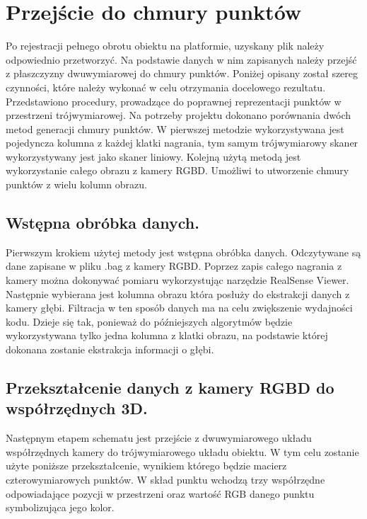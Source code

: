 \section{Przejście do chmury punktów}
Po rejestracji pełnego obrotu obiektu na platformie, uzyskany plik należy odpowiednio przetworzyć. Na podstawie danych w nim zapisanych należy przejść z płaszczyzny dwuwymiarowej do chmury punktów. Poniżej opisany został szereg czynności, które należy wykonać w celu otrzymania docelowego rezultatu. Przedstawiono procedury, prowadzące do poprawnej reprezentacji punktów w przestrzeni trójwymiarowej. Na potrzeby projektu dokonano porównania dwóch metod generacji chmury punktów. W pierwszej metodzie wykorzystywana jest pojedyncza kolumna z każdej klatki nagrania, tym samym trójwymiarowy skaner wykorzystywany jest jako skaner liniowy. Kolejną użytą metodą jest wykorzystanie całego obrazu z kamery RGBD. Umożliwi to utworzenie chmury punktów z wielu kolumn obrazu.
\subsection{Wstępna obróbka danych.}
Pierwszym krokiem użytej metody jest wstępna obróbka danych. Odczytywane są dane zapisane w pliku .bag z kamery RGBD. Poprzez zapis całego nagrania z kamery można dokonywać pomiaru wykorzystując narzędzie RealSense Viewer. Następnie wybierana jest kolumna obrazu która posłuży do ekstrakcji danych z kamery głębi. Filtracja w ten sposób danych ma na celu zwiększenie wydajności kodu. Dzieje się tak, ponieważ do późniejszych algorytmów będzie wykorzystywana tylko jedna kolumna z klatki obrazu, na podstawie której dokonana zostanie ekstrakcja informacji o głębi.

\subsection{Przekształcenie danych z kamery RGBD do współrzędnych 3D.}
Następnym etapem schematu jest przejście z dwuwymiarowego układu współrzędnych kamery do trójwymiarowego układu obiektu. W tym celu zostanie użyte poniższe przekształcenie, wynikiem którego będzie macierz czterowymiarowych punktów. W skład punktu wchodzą trzy współrzędne odpowiadające pozycji w przestrzeni oraz wartość RGB danego punktu symbolizująca jego kolor.


